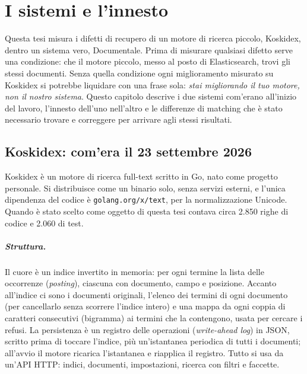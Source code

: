 \chapter{I sistemi e l'innesto}\label{chapter:sistemi}

Questa tesi misura i difetti di recupero di un motore di ricerca piccolo,
Koskidex, dentro un sistema vero, Documentale. Prima di misurare qualsiasi
difetto serve una condizione: che il motore piccolo, messo al posto di
Elasticsearch, trovi gli stessi documenti. Senza quella condizione ogni
miglioramento misurato su Koskidex si potrebbe liquidare con una frase sola:
\emph{stai migliorando il tuo motore, non il nostro sistema}. Questo capitolo
descrive i due sistemi com'erano all'inizio del lavoro, l'innesto dell'uno
nell'altro e le differenze di matching che è stato necessario trovare e
correggere per arrivare agli stessi risultati.

\section{Koskidex: com'era il 23 settembre 2026}\label{sec:koskidex}

Koskidex è un motore di ricerca full-text scritto in Go, nato come progetto
personale. Si distribuisce
come un binario solo, senza servizi esterni, e l'unica dipendenza del codice è
\texttt{golang.org/x/text}, per la normalizzazione Unicode. Quando è stato scelto
come oggetto di questa tesi contava circa 2.850 righe di codice e 2.060 di test.

\paragraph{Struttura.} Il cuore è un indice invertito in memoria: per ogni
termine la lista delle occorrenze (\emph{posting}), ciascuna con documento,
campo e posizione. Accanto all'indice ci sono i documenti originali, l'elenco
dei termini di ogni documento (per cancellarlo senza scorrere l'indice intero) e
una mappa da ogni coppia di caratteri consecutivi (bigramma) ai termini che la
contengono, usata per cercare i refusi. La persistenza è un registro delle operazioni (\emph{write-ahead log}) in
JSON, scritto prima di toccare l'indice, più un'istantanea periodica di tutti i
documenti; all'avvio il motore ricarica l'istantanea e riapplica il registro.
Tutto si usa da un'API HTTP: indici, documenti, impostazioni, ricerca con
filtri e faccette.

